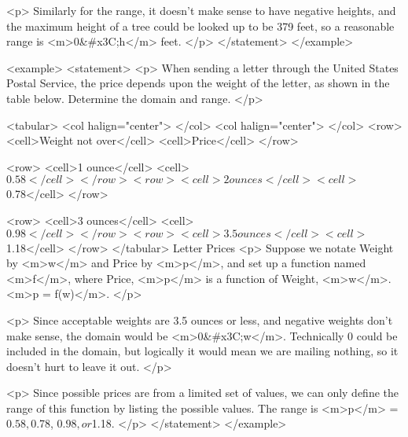                 <p>
                    Similarly for the range, it doesn’t make sense to have negative heights, and the maximum height of a tree could be looked up to be 379 feet, so a reasonable range is <m>0&#x3C;h</m> feet.
                </p>
            </statement>
        </example>

        <example>
            <statement>
                <p>
                    When sending a letter through the United States Postal Service, the price depends upon the weight of the letter, as shown in the table below.
                    Determine the domain and range.
                </p>

                <tabular>
                    <col halign="center"> </col> <col halign="center"> </col>
                    <row>
                        <cell>Weight not over</cell>
                        <cell>Price</cell>
                    </row>

                    <row>
                        <cell>1 ounce</cell>
                        <cell>$0.58</cell>
                    </row>

                    <row>
                        <cell>2 ounces</cell>
                        <cell>$0.78</cell>
                    </row>

                    <row>
                        <cell>3 ounces</cell>
                        <cell>$0.98</cell>
                    </row>

                    <row>
                        <cell>3.5 ounces</cell>
                        <cell>$1.18</cell>
                    </row>
                </tabular>
                Letter Prices
                <p>
                    Suppose we notate Weight by <m>w</m> and Price by <m>p</m>, and set up a function named <m>f</m>, where Price, <m>p</m> is a function of Weight, <m>w</m>.
                    <m>p = f(w)</m>.
                </p>

                <p>
                    Since acceptable weights are 3.5 ounces or less, and negative weights don’t make sense, the domain would be <m>0&#x3C;w</m>.
                    Technically 0 could be included in the domain, but logically it would mean we are mailing nothing, so it doesn’t hurt to leave it out.
                </p>

                <p>
                    Since possible prices are from a limited set of values, we can only define the range of this function by listing the possible values.
                    The range is <m>p</m> = $0.58, $0.78, $0.98, or $1.18.
                </p>
            </statement>
        </example>

